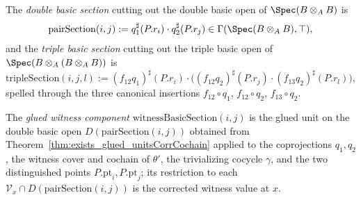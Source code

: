 \begin{definition}
  \label{def:pairTripleSection}
  \leanok
  The \emph{double basic section} cutting out the double basic open of \(\Spec(B \otimes_A B)\)
  is
  \[
    \mathrm{pairSection}(i, j) := q_1^{\sharp}(P.r_i) \cdot q_2^{\sharp}(P.r_j)
    \in \Gamma(\Spec(B \otimes_A B), \top) ,
  \]
  and the \emph{triple basic section} cutting out the triple basic open of
  \(\Spec(B \otimes_A (B \otimes_A B))\) is
  \[
    \mathrm{tripleSection}(i, j, l) := (f_{12} q_1)^{\sharp}(P.r_i) \cdot
      \bigl( (f_{12} q_2)^{\sharp}(P.r_j) \cdot (f_{13} q_2)^{\sharp}(P.r_l) \bigr) ,
  \]
  spelled through the three canonical insertions \(f_{12} \circ q_1\), \(f_{12} \circ q_2\),
  \(f_{13} \circ q_2\).
\end{definition}

\begin{definition}
  \label{def:witnessBasicSection}
  \leanok
  The \emph{glued witness component} \(\mathrm{witnessBasicSection}(i, j)\) is the glued unit on
  the double basic open \(D(\mathrm{pairSection}(i, j))\) obtained from
  Theorem~\ref{thm:exists_glued_unitsCorrCochain} applied to the coprojections \(q_1, q_2\), the
  witness cover and cochain of \(\theta'\), the trivializing cocycle \(\gamma\), and the two
  distinguished points \(P.\mathrm{pt}_i, P.\mathrm{pt}_j\); its restriction to each
  \(\mathcal V_x \cap D(\mathrm{pairSection}(i, j))\) is the corrected witness value at \(x\).
\end{definition}

